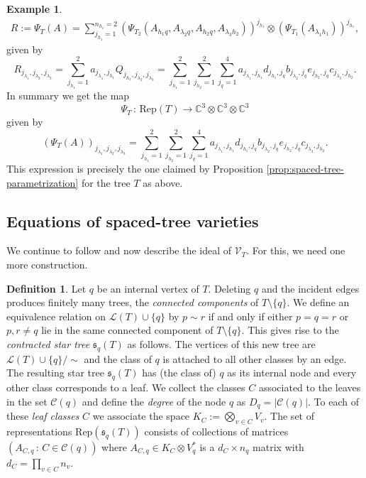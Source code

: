 \documentclass[12pt]{article}
\theoremstyle{definition}
\newtheorem{definition}[theorem]{Definition}
\newtheorem{example}[theorem]{Example}
\numberwithin{theorem}{section}
\newcommand{\CC}{\mathbb{C}}
\newcommand{\V}{\mathcal{V}}
\begin{document}
\begin{example}
\begin{align*}
    R := \Psi_{T}(A) = \sum_{j_{h_1} = 1}^{n_{h_1}=2}(\Psi_{T_2}(A_{h_1 q}, A_{\lambda_2 q}, A_{h_2 q}, A_{\lambda_3h_2}))^{j_{h_1}}\otimes (\Psi_{T_1}(A_{\lambda_1h_1}))^{j_{h_1}},
\end{align*}
given by 
\begin{equation*}
    R_{j_{\lambda_1}, j_{\lambda_2}, j_{\lambda_3}} = \sum_{j_{h_1} = 1}^{2} a_{j_{\lambda_1}, j_{h_1}}Q_{j_{h_1}, j_{\lambda_2}, j_{\lambda_3}} =  \sum_{j_{h_1} = 1}^{2}\sum_{j_{h_2}=1}^2 \sum_{j_q=1}^4 a_{j_{\lambda_1}, j_{h_1}}d_{j_{h_1}, j_q}b_{j_{\lambda_2}, j_q}e_{j_{h_2}, j_q}c_{j_{\lambda_3}, j_{h_2}}.
\end{equation*}
In summary we get the map 
$$ \Psi_T \, : \, \mathrm{Rep}(T) \longrightarrow \CC^3 \otimes \CC^3 \otimes \CC^3$$
given by
$$ (\Psi_T(A))_{j_{\lambda_1}, j_{\lambda_2}, j_{\lambda_3}} = \sum_{j_{h_1} = 1}^{2}\sum_{j_{h_2}=1}^2 \sum_{j_q=1}^4 a_{j_{\lambda_1}, j_{h_1}}d_{j_{h_1}, j_q}b_{j_{\lambda_2}, j_q}e_{j_{h_2}, j_q}c_{j_{\lambda_3}, j_{h_2}}. $$
This expression is precisely the one claimed by Proposition \ref{prop:spaced-tree-parametrization} for the tree $T$ as above.
\end{example}

\subsection{Equations of spaced-tree varieties}\label{sec:equations_DK}
We continue to follow \cite{DK09} and now describe the ideal of $\V_T$.
For this, we need one more construction.
\begin{definition}\cite{DK09}\label{def:contracted_star_tree}
    Let $q$ be an internal vertex of $T$. Deleting $q$ and the incident edges produces finitely many trees, the \emph{connected components} of $T \setminus \{q\}$. We define an equivalence relation on $\mathcal{L}(T) \cup \{q\}$ by $p \sim r$ if and only if either $p=q=r$
or $p,r \neq q$ lie in the same connected component of 
 $T \setminus \{q\}$. 
This gives rise to the \emph{contracted star tree} $\mathfrak{s}_q(T)$ as follows. The vertices of this new tree are $\mathcal{L}(T) \cup \{q\}  / \sim$ and the class of $q$ is attached to all other classes by an edge. The resulting star tree $\mathfrak{s}_q(T)$ has (the class of) $q$ as its internal node and every other class corresponds to a leaf. We collect the classes $C$ associated to the leaves in the set $\mathcal{C}(q)$ and define the \emph{degree} of the node $q$ as $
D_q = |\mathcal{C}(q)|$. To each of these \emph{leaf classes} $C$ we associate the space $K_C := \bigotimes_{v \in C} V_v$. 
 The set of representations $\mathrm{Rep}(\mathfrak{s}_q(T))$ consists of collections of matrices $(A_{C, q} \, : \, C \in \mathcal{C}(q))$
where $A_{C,q} \in K  _C \otimes V_q^*$ is a $d_C \times n_q$ matrix with $d_C = \prod_{v \in C} n_v$.
\end{definition}
\end{document}
